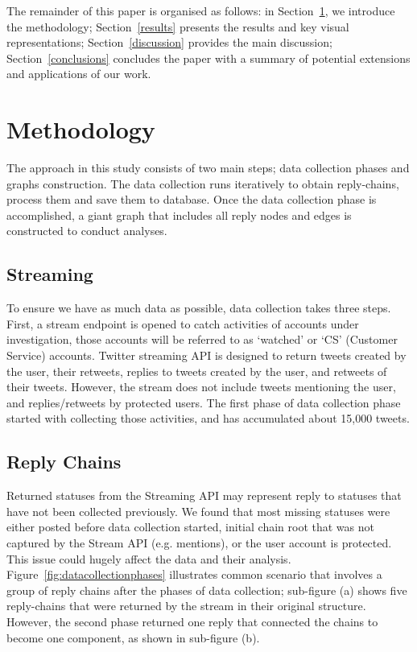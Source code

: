 \documentclass[sigconf]{acmart}
\begin{document}
The remainder of this paper is organised as follows: in
Section~\ref{method}, we introduce the methodology;
Section~\ref{results} presents the results and key visual
representations; Section~\ref{discussion} provides the main
discussion; Section~\ref{conclusions} concludes the paper with a
summary of potential extensions and applications of our work.


\section{Methodology}\label{method}

The approach in this study consists of two main steps; data
collection phases and graphs construction. The data collection
runs iteratively to obtain reply-chains, process them and save them to
database. Once the data collection phase is accomplished, a giant
graph that includes all reply nodes and edges is constructed to conduct analyses.


\subsection{Streaming}

To ensure we have as much data as possible, data collection takes
three steps. First, a stream endpoint is opened to catch activities of
accounts under investigation, those accounts will be referred to as
`watched' or `CS' (Customer Service) accounts. Twitter streaming API
is designed to return tweets created by the user, their retweets,
replies to tweets created by the user, and retweets of their
tweets. However, the stream does not include tweets mentioning the
user, and replies/retweets by protected users. The first phase of data
collection phase started with collecting those activities, and has
accumulated about 15,000 tweets.

\subsection{Reply Chains}

Returned statuses from the Streaming API may represent reply to
statuses that have not been collected previously. We found that most
missing statuses were either posted before data collection started,
initial chain root that was not captured by the Stream API
(e.g. mentions), or the user account is protected. This issue could
hugely affect the data and their
analysis. Figure~\ref{fig:datacollectionphases} illustrates common
scenario that involves a group of reply chains after the phases of
data collection; sub-figure (a) shows five reply-chains that were
returned by the stream in their original structure. However, the
second phase returned one reply that connected the chains to become
one component, as shown in sub-figure (b).
\end{document}

